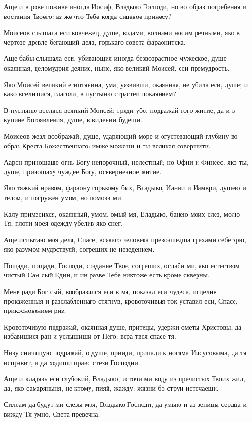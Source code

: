 Аще и в рове поживе иногда Иосиф, Владыко Господи, но во образ погребения и востания Твоего: аз же что Тебе когда сицевое принесу?


Моисеов слышала еси ковчежец, душе, водами, волнами носим речными, яко в чертозе древле бегающий дела, горькаго совета фараонитска.


Аще бабы слышала еси, убивающия иногда безвозрастное мужеское, душе окаянная, целомудрия деяние, ныне, яко великий Моисей, сси премудрость.


Яко Моисей великий египтянина, ума, уязвивши, окаянная, не убила еси, душе; и како вселишися, глаголи, в пустыню страстей покаянием?


В пустыню вселися великий Моисей; гряди убо, подражай того житие, да и в купине Богоявления, душе, в видении будеши.


Моисеов жезл воображай, душе, ударяющий море и огустевающий глубину во образ Креста Божественнаго: имже можеши и ты великая совершити.


Аарон приношаше огнь Богу непорочный, нелестный; но Офни и Финеес, яко ты, душе, приношаху чуждее Богу, оскверненное житие.


Яко тяжкий нравом, фараону горькому бых, Владыко, Ианни и Иамври, душею и телом, и погружен умом, но помози ми.


Калу примесихся, окаянный, умом, омый мя, Владыко, банею моих слез, молю Тя, плоти моея одежду убелив яко снег.


Аще испытаю моя дела, Спасе, всякаго человека превозшедша грехами себе зрю, яко разумом мудрствуяй, согреших не неведением.


Пощади, пощади, Господи, создание Твое, согреших, ослаби ми, яко естеством чистый Сам сый Един, и ин разве Тебе никтоже есть кроме скверны.


Мене ради Бог сый, вообразился еси в мя, показал еси чудеса, исцелив прокаженныя и разслабленнаго стягнув, кровоточивыя ток уставил еси, Спасе, прикосновением риз.


Кровоточивую подражай, окаянная душе, притецы, удержи ометы Христовы, да избавишися ран и услышиши от Него: вера твоя спасе тя.


Низу сничащую подражай, о душе, прииди, припади к ногама Иисусовыма, да тя исправит, и да ходиши право стези Господни.


Аще и кладязь еси глубокий, Владыко, источи ми воду из пречистых Твоих жил, да, яко самаряныня, не ктому, пияй, жажду: жизни бо струи источаеши.


Силоам да будут ми слезы моя, Владыко Господи, да умыю и аз зеницы сердца и вижду Тя умно, Света превечна.


